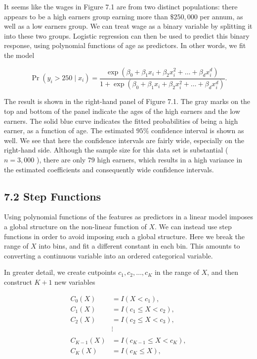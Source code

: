\documentclass[10pt]{article}
\begin{document}
It seems like the wages in Figure 7.1 are from two distinct populations: there appears to be a high earners group earning more than $\$ 250,000$ per annum, as well as a low earners group. We can treat wage as a binary variable by splitting it into these two groups. Logistic regression can then be used to predict this binary response, using polynomial functions of age as predictors. In other words, we fit the model


\begin{equation*}
\operatorname{Pr}\left(y_{i}>250 \mid x_{i}\right)=\frac{\exp \left(\beta_{0}+\beta_{1} x_{i}+\beta_{2} x_{i}^{2}+\ldots+\beta_{d} x_{i}^{d}\right)}{1+\exp \left(\beta_{0}+\beta_{1} x_{i}+\beta_{2} x_{i}^{2}+\ldots+\beta_{d} x_{i}^{d}\right)} . \tag{7.3}
\end{equation*}


The result is shown in the right-hand panel of Figure 7.1. The gray marks on the top and bottom of the panel indicate the ages of the high earners and the low earners. The solid blue curve indicates the fitted probabilities of being a high earner, as a function of age. The estimated $95 \%$ confidence interval is shown as well. We see that here the confidence intervals are fairly wide, especially on the right-hand side. Although the sample size for this data set is substantial ( $n=3,000$ ), there are only 79 high earners, which results in a high variance in the estimated coefficients and consequently wide confidence intervals.

\subsection*{7.2 Step Functions}
Using polynomial functions of the features as predictors in a linear model imposes a global structure on the non-linear function of $X$. We can instead use step functions in order to avoid imposing such a global structure. Here we break the range of $X$ into bins, and fit a different constant in each bin. This amounts to converting a continuous variable into an ordered categorical variable.

In greater detail, we create cutpoints $c_{1}, c_{2}, \ldots, c_{K}$ in the range of $X$, and then construct $K+1$ new variables


\begin{align*}
C_{0}(X) & =I\left(X<c_{1}\right), \\
C_{1}(X) & =I\left(c_{1} \leq X<c_{2}\right), \\
C_{2}(X) & =I\left(c_{2} \leq X<c_{3}\right), \\
& \vdots  \tag{7.4}\\
& \\
C_{K-1}(X) & =I\left(c_{K-1} \leq X<c_{K}\right), \\
C_{K}(X) & =I\left(c_{K} \leq X\right),
\end{align*}
\end{document}
